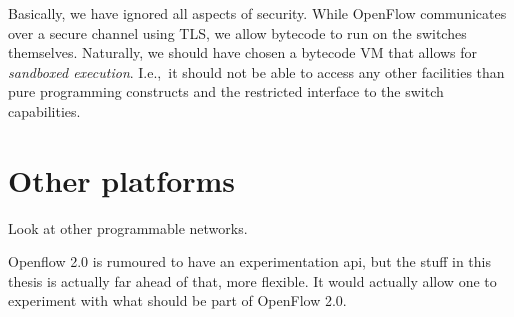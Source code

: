 Basically, we have ignored all aspects of security.  While OpenFlow
communicates over a secure channel using \ac{TLS}, we allow bytecode to run
on the switches themselves.  Naturally, we should have chosen a bytecode
\acs{VM} that allows for \textit{sandboxed execution}.  I.e.,~it should not
be able to access any other facilities than pure programming constructs and
the restricted interface to the switch capabilities.


\section{Other platforms}

Look at other programmable networks.

Openflow 2.0 is rumoured to have an experimentation api, but the stuff in
this thesis is actually far ahead of that, more flexible.
It would actually allow one to experiment with what should be part of
OpenFlow 2.0.
